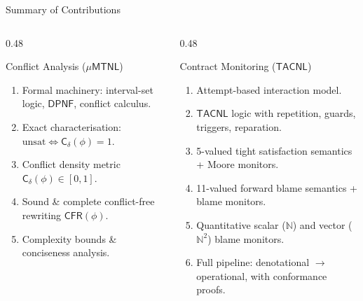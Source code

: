 \documentclass[9pt,aspectratio=169]{beamer}
\newcommand{\logic}[1]{\ensuremath{\mathsf{#1}}\xspace}
\newcommand{\TDDLfm}{\logic{\mu MTNL}}
\newcommand{\cDL}{\logic{TACNL}}
\newcommand{\dpnf}{\ensuremath{\mathsf{DPNF}}}
\newcommand{\cd}{\ensuremath{\mathsf{C_\delta}}\xspace}
\newcommand{\Namb}{\ensuremath{\mathsf{CFR}}\xspace}
\begin{document}
\begin{frame}{Summary of Contributions}
\small
\begin{columns}[T]
\begin{column}{0.48\textwidth}
  \begin{block}{\textcolor{ConflictBlue}{Conflict Analysis ($\TDDLfm$)}}
    \begin{enumerate}
      \item Formal machinery: interval-set logic, \dpnf, conflict calculus.
      \item Exact characterisation: $\text{unsat} \Leftrightarrow \cd(\phi) = 1$.
      \item Conflict density metric $\cd(\phi) \in [0,1]$.
      \item Sound \& complete conflict-free rewriting $\Namb(\phi)$.
      \item Complexity bounds \& conciseness analysis.
    \end{enumerate}
  \end{block}
\end{column}
\begin{column}{0.48\textwidth}
  \begin{block}{\textcolor{ConflictGreen}{Contract Monitoring (\cDL)}}
    \begin{enumerate}
      \item Attempt-based interaction model.
      \item \cDL logic with repetition, guards, triggers, reparation.
      \item 5-valued tight satisfaction semantics + Moore monitors.
      \item 11-valued forward blame semantics + blame monitors.
      \item Quantitative scalar ($\mathbb{N}$) and vector ($\mathbb{N}^2$) blame monitors.
      \item Full pipeline: denotational $\to$ operational, with conformance proofs.
    \end{enumerate}
  \end{block}
\end{column}
\end{columns}
\end{frame}
\end{document}
